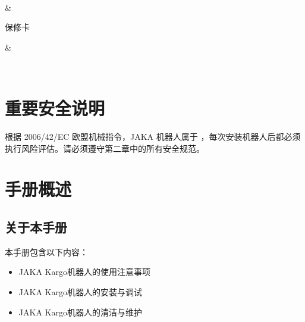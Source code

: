 \documentclass[a4paper,11pt,english,openany,oneside]{sphinxmanual}
\begin{document}
\begin{savenotes}
\begin{tabular}[t]{}
\begin{varwidth}[t]{}
\end{varwidth}%
\\
\sphinxhline\begin{varwidth}[t]{}
\sphinxbeforeendvarwidth
\end{varwidth}%
&\begin{varwidth}[t]{}
\sphinxAtStartPar
保修卡
\sphinxbeforeendvarwidth
\end{varwidth}%
&\begin{varwidth}[t]{}
\sphinxbeforeendvarwidth
\end{varwidth}%
\\
\sphinxbottomrule
\end{tabular}
\sphinxtableafterendhook\par
\sphinxattableend\end{savenotes}


\chapter{重要安全说明}
\label{\detokenize{03 _u4ea7_u54c1_u6e05_u5355:id2}}
\sphinxAtStartPar
根据 2006/42/EC 欧盟机械指令，JAKA 机器人属于  ，每次安装机器人后都必须执行风险评估。请必须遵守第二章中的所有安全规范。

\sphinxstepscope


\chapter{手册概述}
\label{\detokenize{04 _u624b_u518c_u6982_u8ff0:id1}}\label{\detokenize{04 _u624b_u518c_u6982_u8ff0::doc}}

\section{关于本手册}
\label{\detokenize{04 _u624b_u518c_u6982_u8ff0:id2}}
\sphinxAtStartPar
本手册包含以下内容：
\begin{itemize}
\item {} 
\sphinxAtStartPar
JAKA Kargo机器人的使用注意事项

\item {} 
\sphinxAtStartPar
JAKA Kargo机器人的安装与调试

\item {} 
\sphinxAtStartPar
JAKA Kargo机器人的清洁与维护

\end{itemize}
\end{document}
